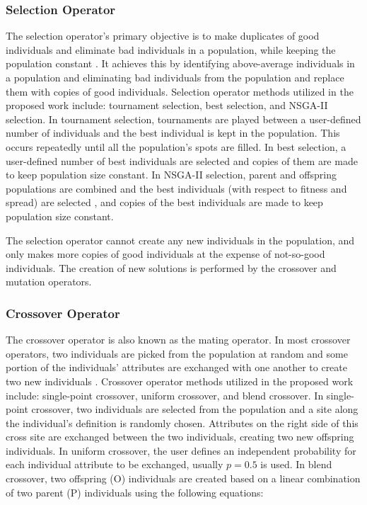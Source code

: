\subsubsection{Selection Operator}
The selection operator's primary objective is to make duplicates of good 
individuals and eliminate bad individuals in a population, while keeping the 
population constant \cite{deb_multi-objective_2001}. 
It achieves this by identifying above-average individuals in a population and 
eliminating bad individuals from the population and replace them with copies 
of good individuals. 
Selection operator methods utilized in the proposed work include: tournament 
selection, best selection, and NSGA-II selection. 
In tournament selection, tournaments are played between a user-defined number 
of individuals and the best individual is kept in the population. 
This occurs repeatedly until all the population's spots are filled. 
In best selection, a user-defined number of best individuals are selected 
and copies of them are made to keep population size constant. 
In NSGA-II selection, parent and offspring populations are combined and the
best individuals (with respect to fitness and spread) are selected
\cite{deb_fast_2002}, and copies of the best individuals are made to keep 
population size constant. 

The selection operator cannot create any new individuals in the population, 
and only makes more copies of good individuals at the expense of not-so-good
individuals. 
The creation of new solutions is performed by the crossover and mutation 
operators. 

\subsubsection{Crossover Operator}
The crossover operator is also known as the mating operator. 
In most crossover operators, two individuals are picked from the population at 
random and some portion of the individuals' attributes are exchanged with one 
another to create two new individuals \cite{deb_multi-objective_2001}. 
Crossover operator methods utilized in the proposed work include: single-point
crossover, uniform crossover, and blend crossover. 
In single-point crossover, two individuals are selected from the population and 
a site along the individual's definition is randomly chosen. 
Attributes on the right side of this cross site are exchanged between the two 
individuals, creating two new offspring individuals.  
In uniform crossover, the user defines an independent probability for each 
individual attribute to be exchanged, usually $p=0.5$ is used. 
In blend crossover, two offspring (O) individuals are created based on a linear 
combination of two parent (P) individuals using the following equations: 

